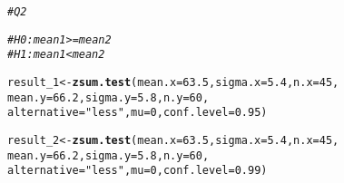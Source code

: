 \documentclass{article}\usepackage[]{graphicx}\usepackage[]{xcolor}
\makeatletter
\newcommand{\hlnum}[1]{\textcolor[rgb]{0.686,0.059,0.569}{#1}}%
\newcommand{\hlsng}[1]{\textcolor[rgb]{0.192,0.494,0.8}{#1}}%
\newcommand{\hlcom}[1]{\textcolor[rgb]{0.678,0.584,0.686}{\textit{#1}}}%
\newcommand{\hldef}[1]{\textcolor[rgb]{0.345,0.345,0.345}{#1}}%
\newcommand{\hlkwb}[1]{\textcolor[rgb]{0.69,0.353,0.396}{#1}}%
\newcommand{\hlkwc}[1]{\textcolor[rgb]{0.333,0.667,0.333}{#1}}%
\newcommand{\hlkwd}[1]{\textcolor[rgb]{0.737,0.353,0.396}{\textbf{#1}}}%
\newenvironment{kframe}{%
 \def\at@end@of@kframe{}%
 \ifinner\ifhmode%
  \def\at@end@of@kframe{\end{minipage}}%
  \begin{minipage}{\columnwidth}%
 \fi\fi%
 \def\FrameCommand##1{\hskip\@totalleftmargin \hskip-\fboxsep
 \colorbox{shadecolor}{##1}\hskip-\fboxsep
     \hskip-\linewidth \hskip-\@totalleftmargin \hskip\columnwidth}%
 \MakeFramed {\advance\hsize-\width
   \@totalleftmargin\z@ \linewidth\hsize
   \@setminipage}}%
 {\par\unskip\endMakeFramed%
 \at@end@of@kframe}
\newenvironment{knitrout}{}{} %
\makeatother
\begin{document}
\begin{knitrout}
\color{fgcolor}\begin{kframe}
\begin{alltt}
\hlcom{# Q2}

\hlcom{# H0 : mean1 > = mean2}
\hlcom{# H1 : mean1 < mean2}

\hldef{result_1} \hlkwb{<-} \hlkwd{zsum.test}\hldef{(}\hlkwc{mean.x} \hldef{=} \hlnum{63.5}\hldef{,} \hlkwc{sigma.x} \hldef{=} \hlnum{5.4}\hldef{,} \hlkwc{n.x} \hldef{=} \hlnum{45}\hldef{,}
                    \hlkwc{mean.y} \hldef{=} \hlnum{66.2}\hldef{,} \hlkwc{sigma.y} \hldef{=} \hlnum{5.8}\hldef{,} \hlkwc{n.y} \hldef{=} \hlnum{60}\hldef{,}
                    \hlkwc{alternative} \hldef{=} \hlsng{"less"}\hldef{,} \hlkwc{mu} \hldef{=} \hlnum{0}\hldef{,} \hlkwc{conf.level} \hldef{=} \hlnum{0.95}\hldef{)}

\hldef{result_2} \hlkwb{<-} \hlkwd{zsum.test}\hldef{(}\hlkwc{mean.x} \hldef{=} \hlnum{63.5}\hldef{,} \hlkwc{sigma.x} \hldef{=} \hlnum{5.4}\hldef{,} \hlkwc{n.x} \hldef{=} \hlnum{45}\hldef{,}
                    \hlkwc{mean.y} \hldef{=} \hlnum{66.2}\hldef{,} \hlkwc{sigma.y} \hldef{=} \hlnum{5.8}\hldef{,} \hlkwc{n.y} \hldef{=} \hlnum{60}\hldef{,}
                    \hlkwc{alternative} \hldef{=} \hlsng{"less"}\hldef{,} \hlkwc{mu} \hldef{=} \hlnum{0}\hldef{,} \hlkwc{conf.level} \hldef{=} \hlnum{0.99}\hldef{)}


\end{alltt}
\end{kframe}
\end{knitrout}
\end{document}
